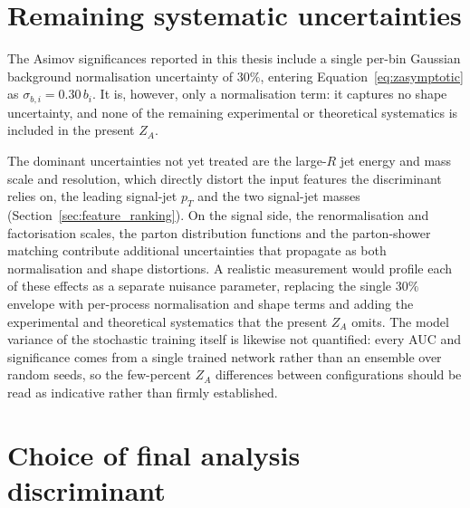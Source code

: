 \section{Remaining systematic uncertainties}
\label{sec:disc_systematics}

The Asimov significances reported in this thesis include a single per-bin Gaussian background normalisation uncertainty of $30\%$, entering Equation~\eqref{eq:zasymptotic} as $\sigma_{b,i}=0.30\,b_i$. It is, however, only a normalisation term: it captures no shape uncertainty, and none of the remaining experimental or theoretical systematics is included in the present $Z_A$.

The dominant uncertainties not yet treated are the large-$R$ jet energy and mass scale and resolution, which directly distort the input features the discriminant relies on, the leading signal-jet $p_T$ and the two signal-jet masses (Section~\ref{sec:feature_ranking}). On the signal side, the renormalisation and factorisation scales, the parton distribution functions and the parton-shower matching contribute additional uncertainties that propagate as both normalisation and shape distortions. A realistic measurement would profile each of these effects as a separate nuisance parameter, replacing the single $30\%$ envelope with per-process normalisation and shape terms and adding the experimental and theoretical systematics that the present $Z_A$ omits. The model variance of the stochastic training itself is likewise not quantified: every AUC and significance comes from a single trained network rather than an ensemble over random seeds, so the few-percent $Z_A$ differences between configurations should be read as indicative rather than firmly established.
\section{Choice of final analysis discriminant}
\label{sec:disc_discriminant}

